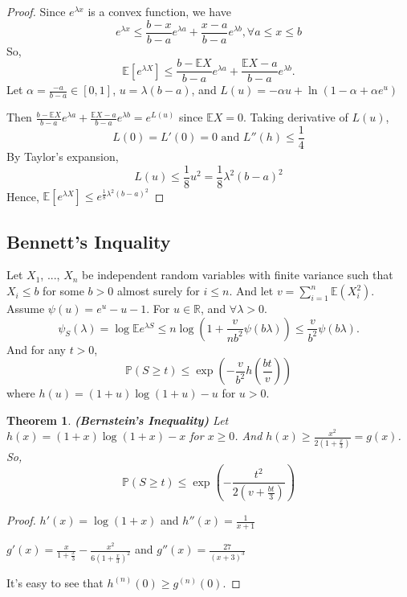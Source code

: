 \documentclass[11pt]{article}
\def\BP{{\bf P}}
\def\BR{{\mathbb R}}
\def\BE{{\mathbb E}}
\def\BP{{\mathbb P}}
\newtheorem{theorem}{Theorem}[section]
\begin{document}
\begin{proof}
 Since $e^{\lambda x}$ is a convex function, we have 
 \[ e^{\lambda x} \leq \frac{b - x}{b - a} e^{\lambda a} + \frac{x - a}{b - a} e^{\lambda b}, \forall a \leq x \leq b \]
 So, 
 \[ \BE[e^{\lambda X}] \leq \frac{b - \BE X}{b - a} e^{\lambda a} + \frac{\BE X - a}{b - a} e^{\lambda b}. \]
 Let $\alpha = \frac{-a}{b - a} \in [0, 1]$, $u = \lambda(b -a)$, and $L(u) = -\alpha u + \ln (1 - \alpha + \alpha e^u)$
 
 Then $\frac{b - \BE X}{b - a} e^{\lambda a} + \frac{\BE X - a}{b - a} e^{\lambda b} = e^{L(u)}$ since $\BE X = 0$. 
 Taking derivative of $L(u)$,
 \[ L(0) = L'(0) = 0 \text{ and } L''(h) \leq \frac{1}{4} \]
 By Taylor's expansion, 
 \[ L(u) \leq \frac{1}{8}u^2 = \frac{1}{8}\lambda^2(b-a)^2 \]
 Hence, $\BE[e^{\lambda X}] \leq e^{\frac{1}{8} \lambda^2 (b-a)^2}$
\end{proof}


\subsection{Bennett's Inquality}

Let $X_1$, ..., $X_n$ be independent random variables with finite variance such that $X_i \leq b$ for some $b > 0$ almost surely for $i \leq n$. And let $v = \sum_{i=1}^n \BE(X_i^2)$. Assume $\psi(u) = e^u - u - 1$. For $u \in \BR$, and $\forall \lambda > 0$.
\[
\psi_S(\lambda) = \log \BE e^{\lambda S} \leq n \log (1 + \frac{v}{nb^2} \psi(b\lambda)) \leq \frac{v}{b^2} \psi(b\lambda).
\]
And for any $t > 0$,
\[
\BP (S \geq t) \leq \exp(-\frac{v}{b^2} h(\frac{bt}{v}))
\]
where $h(u) = (1 + u)\log(1+u) - u$ for $u > 0$.


\begin{theorem}\textbf{(Bernstein's Inequality)}
Let $h(x) = (1+x)\log(1+x) - x$ for $x \geq 0$. And $h(x) \geq \frac{x^2}{2(1 + \frac{x}{3})} = g(x)$.
So,
\[
\BP(S \geq t) \leq \exp\left( - \frac{t^2}{2 (v+\frac{bt}{3})}\right)
\]

\end{theorem}

\begin{proof}
$h'(x) = \log(1+x)$ and $h''(x) = \frac{1}{x+1}$

$g'(x) = \frac{x}{1 + \frac{x}{3}} - \frac{x^2}{6(1+\frac{x}{3})^2}$ and $g''(x) = \frac{27}{(x+3)^3}$

It's easy to see that $h^{(n)}(0) \geq g^{(n)}(0)$.
\end{proof}
\end{document}
